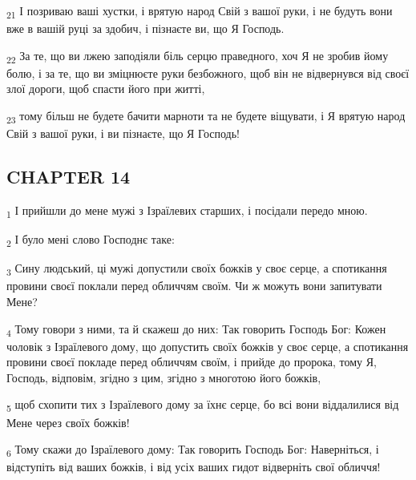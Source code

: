 \begin{tcolorbox}
\textsubscript{21} І позриваю ваші хустки, і врятую народ Свій з вашої руки, і не будуть вони вже в вашій руці за здобич, і пізнаєте ви, що Я Господь.
\end{tcolorbox}
\begin{tcolorbox}
\textsubscript{22} За те, що ви лжею заподіяли біль серцю праведного, хоч Я не зробив йому болю, і за те, що ви зміцнюєте руки безбожного, щоб він не відвернувся від своєї злої дороги, щоб спасти його при житті,
\end{tcolorbox}
\begin{tcolorbox}
\textsubscript{23} тому більш не будете бачити марноти та не будете віщувати, і Я врятую народ Свій з вашої руки, і ви пізнаєте, що Я Господь!
\end{tcolorbox}
\subsection{CHAPTER 14}
\begin{tcolorbox}
\textsubscript{1} І прийшли до мене мужі з Ізраїлевих старших, і посідали передо мною.
\end{tcolorbox}
\begin{tcolorbox}
\textsubscript{2} І було мені слово Господнє таке:
\end{tcolorbox}
\begin{tcolorbox}
\textsubscript{3} Сину людський, ці мужі допустили своїх божків у своє серце, а спотикання провини своєї поклали перед обличчям своїм. Чи ж можуть вони запитувати Мене?
\end{tcolorbox}
\begin{tcolorbox}
\textsubscript{4} Тому говори з ними, та й скажеш до них: Так говорить Господь Бог: Кожен чоловік з Ізраїлевого дому, що допустить своїх божків у своє серце, а спотикання провини своєї покладе перед обличчям своїм, і прийде до пророка, тому Я, Господь, відповім, згідно з цим, згідно з многотою його божків,
\end{tcolorbox}
\begin{tcolorbox}
\textsubscript{5} щоб схопити тих з Ізраїлевого дому за їхнє серце, бо всі вони віддалилися від Мене через своїх божків!
\end{tcolorbox}
\begin{tcolorbox}
\textsubscript{6} Тому скажи до Ізраїлевого дому: Так говорить Господь Бог: Наверніться, і відступіть від ваших божків, і від усіх ваших гидот відверніть свої обличчя!
\end{tcolorbox}
